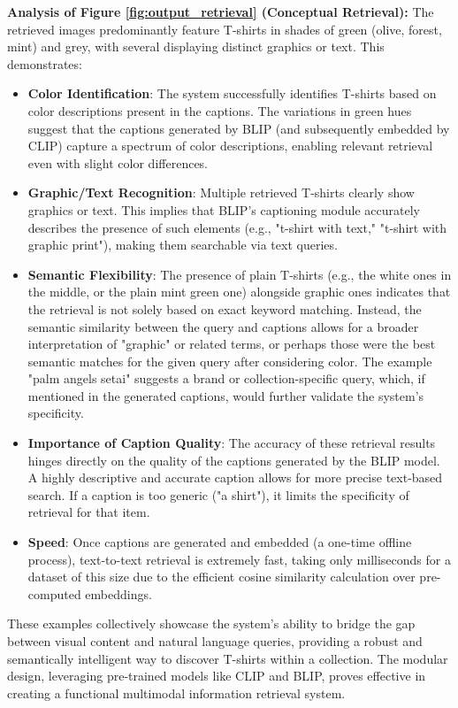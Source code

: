\documentclass{article}
\begin{document}
\textbf{Analysis of Figure \ref{fig:output_retrieval} (Conceptual Retrieval):}
The retrieved images predominantly feature T-shirts in shades of green (olive, forest, mint) and grey, with several displaying distinct graphics or text. This demonstrates:
\begin{itemize}
    \item \textbf{Color Identification}: The system successfully identifies T-shirts based on color descriptions present in the captions. The variations in green hues suggest that the captions generated by BLIP (and subsequently embedded by CLIP) capture a spectrum of color descriptions, enabling relevant retrieval even with slight color differences.
    \item \textbf{Graphic/Text Recognition}: Multiple retrieved T-shirts clearly show graphics or text. This implies that BLIP's captioning module accurately describes the presence of such elements (e.g., "t-shirt with text," "t-shirt with graphic print"), making them searchable via text queries.
    \item \textbf{Semantic Flexibility}: The presence of plain T-shirts (e.g., the white ones in the middle, or the plain mint green one) alongside graphic ones indicates that the retrieval is not solely based on exact keyword matching. Instead, the semantic similarity between the query and captions allows for a broader interpretation of "graphic" or related terms, or perhaps those were the best semantic matches for the given query after considering color. The example "palm angels setai" suggests a brand or collection-specific query, which, if mentioned in the generated captions, would further validate the system's specificity.
    \item \textbf{Importance of Caption Quality}: The accuracy of these retrieval results hinges directly on the quality of the captions generated by the BLIP model. A highly descriptive and accurate caption allows for more precise text-based search. If a caption is too generic ("a shirt"), it limits the specificity of retrieval for that item.
\item \textbf{Speed}: Once captions are generated and embedded (a one-time offline process), text-to-text retrieval is extremely fast, taking only milliseconds for a dataset of this size due to the efficient cosine similarity calculation over pre-computed embeddings.
\end{itemize}
These examples collectively showcase the system's ability to bridge the gap between visual content and natural language queries, providing a robust and semantically intelligent way to discover T-shirts within a collection. The modular design, leveraging pre-trained models like CLIP and BLIP, proves effective in creating a functional multimodal information retrieval system.
\end{document}
